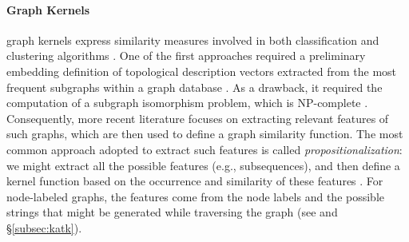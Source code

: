 \paragraph*{Graph Kernels} graph kernels express similarity measures \cite{Samatova} involved in both classification and clustering algorithms \cite{TsudaS10}. One of the first approaches required a preliminary embedding definition of topological description vectors extracted from the most frequent subgraphs within a graph database \cite{Sidere}. As a drawback, it required the computation of a subgraph isomorphism problem, which is NP-complete \cite{GartnerFW03}. 
Consequently, more recent literature focuses on extracting relevant features of such graphs, which are then used to define a graph similarity function. The most common approach adopted to extract such features is called \textit{propositionalization}: we might extract all the possible features (e.g., subsequences), and then define a kernel function based on the occurrence and similarity of these features \cite{Gartner03}. For node-labeled graphs, the features come from the node labels and the possible strings that might be generated while traversing the graph (see \cite{Gartner03} and \S\ref{subsec:katk}). 